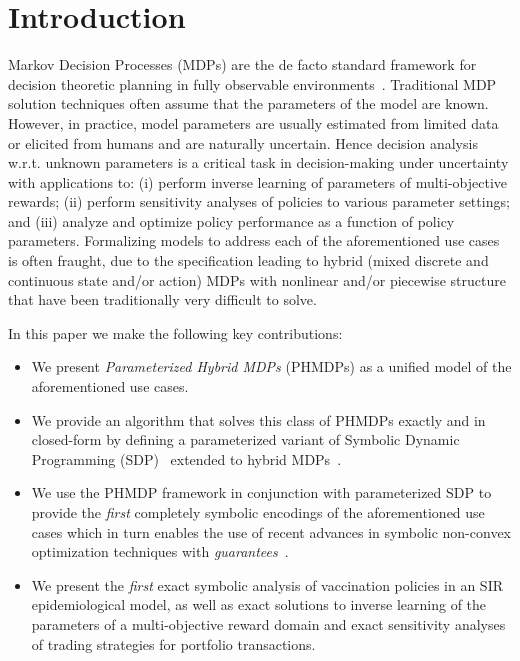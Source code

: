 \section{Introduction}
\label{sec:introduction}

Markov Decision Processes (MDPs) are the de facto standard framework for decision theoretic planning in fully observable environments~\cite{Boutilier_JAIR_1999}. Traditional MDP solution techniques often assume that the parameters of the model are known. However, in practice, model parameters are usually estimated from limited data or elicited from humans and are naturally uncertain. Hence decision analysis w.r.t. unknown parameters is a critical task in decision-making under uncertainty with applications to: (i) perform inverse learning of parameters of multi-objective rewards; (ii) perform sensitivity analyses of policies to various parameter settings; and (iii) analyze and optimize policy performance as a function of policy parameters. Formalizing models to address each of the aforementioned use cases is often fraught, due to the specification leading to hybrid (mixed discrete and continuous state and/or action) MDPs with nonlinear and/or piecewise structure that have been traditionally very difficult to solve.

In this paper we make the following key contributions:
\begin{itemize}
\item We present {\it Parameterized Hybrid MDPs} (PHMDPs) as a unified model of the aforementioned use cases.
\item We provide an algorithm that solves this class of PHMDPs exactly and in closed-form by defining a parameterized variant of Symbolic Dynamic Programming (SDP)~\cite{Boutilier_IJCAI_2001} extended to hybrid MDPs~\cite{Sanner_UAI_2011}. 
\item We use the PHMDP framework in conjunction with parameterized SDP to provide the \textit{first} completely symbolic encodings of the aforementioned use cases which in turn enables the use of recent advances in symbolic non-convex optimization techniques with \textit{guarantees}~\cite{Gao2013}.
\item We present the \textit{first} exact symbolic analysis of vaccination policies in an SIR epidemiological model, as well as exact solutions to inverse learning of the parameters of a multi-objective reward domain and exact sensitivity analyses of trading strategies for portfolio transactions. 
\end{itemize}